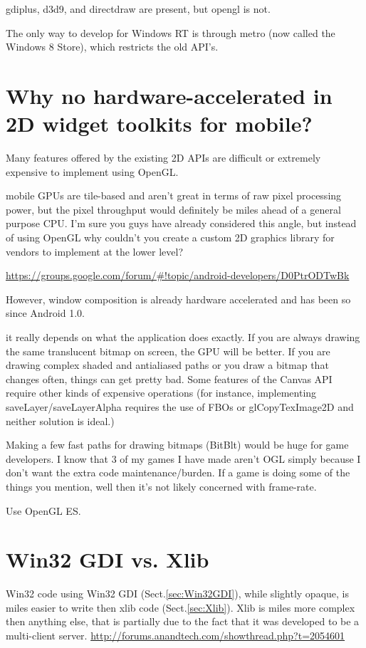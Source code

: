 gdiplus, d3d9, and directdraw are present, but opengl is not.
 
 The only way to develop for Windows RT is through metro (now called the Windows
 8 Store), which restricts the old API's.

\section{Why no hardware-accelerated in 2D widget toolkits for mobile?}

Many features offered by the existing 2D APIs are difficult
or extremely expensive to implement using OpenGL. 

mobile GPUs are tile-based and aren't great in terms of raw pixel processing
power, but the pixel throughput would definitely be miles ahead of a general
purpose CPU.
I'm sure you guys have already considered this angle, but instead of using
OpenGL why couldn't you create a custom 2D graphics library for vendors to
implement at the lower level?

\url{https://groups.google.com/forum/#!topic/android-developers/D0PtrODTwBk}

However,  window composition is already hardware
accelerated and has been so since Android 1.0.

it really depends on what the application does exactly. If you
are always drawing the same translucent bitmap on screen, the GPU will
be better. If you are drawing complex shaded and antialiased paths or
you draw a bitmap that changes often, things can get pretty bad. Some
features of the Canvas API require other kinds of expensive operations
(for instance, implementing saveLayer/saveLayerAlpha requires the use
of FBOs or glCopyTexImage2D and neither solution is ideal.)


 Making a few fast paths for drawing bitmaps (BitBlt) would be huge for 
game developers.  I know that 3 of my games I have made aren't OGL 
simply because I don't want the extra code maintenance/burden.  If a 
game is doing some of the things you mention, well then it's not likely 
concerned with frame-rate.

Use OpenGL ES.


\section{Win32 GDI vs. Xlib}
\label{sec:WIN32_Xlib}

Win32 code using Win32 GDI (Sect.\ref{sec:Win32GDI}), while slightly opaque, is
miles easier to write then xlib code (Sect.\ref{sec:Xlib}). Xlib is miles more
complex then anything else, that is partially due to the fact that it was
developed to be a multi-client server.
\url{http://forums.anandtech.com/showthread.php?t=2054601}

